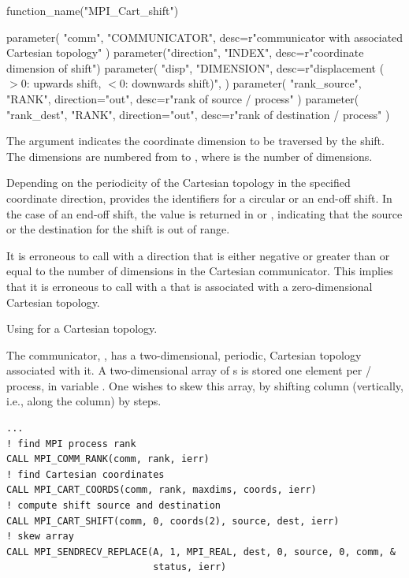 \begin{mpi-binding}
    function_name("MPI_Cart_shift")
    
    parameter(
        "comm", "COMMUNICATOR", desc=r"communicator with associated Cartesian topology"
    )
    parameter("direction", "INDEX", desc=r"coordinate dimension of shift")
    parameter(
        "disp",
        "DIMENSION",
        desc=r"displacement ($> 0$: upwards shift, $< 0$: downwards shift)",
    )
    parameter(
        "rank_source", "RANK", direction="out", desc=r"rank of source \MPI/ process"
    )
    parameter(
        "rank_dest", "RANK", direction="out", desc=r"rank of destination \MPI/ process"
    )
\end{mpi-binding}

The  argument indicates the coordinate dimension to be traversed by the shift.
The dimensions are numbered from  to , where  is the number of dimensions.

Depending on the periodicity of the Cartesian topology in the specified
coordinate direction,  provides the identifiers for a
circular or an end-off shift. In the case of an end-off shift,
the value  is returned in  or
,
indicating that the source or the destination for the shift is out of range.
 
It is erroneous to call  with a direction that is either
negative or greater than or equal to the number of dimensions in the Cartesian
communicator. This implies that it is erroneous to call  with a
 that is associated with a zero-dimensional Cartesian topology.

\begin{example}
\label{topol-exD}
%
Using  for a Cartesian topology.

The communicator, , has a two-dimensional, periodic, Cartesian
topology associated with it.  A two-dimensional array of s is stored
one element per \MPI/ process, in variable .  One wishes to skew this array,
by shifting column  (vertically, i.e., along the column) by
 steps.
\begin{lstlisting}[language={[MPI]Fortran}]
...
! find MPI process rank
CALL MPI_COMM_RANK(comm, rank, ierr)
! find Cartesian coordinates
CALL MPI_CART_COORDS(comm, rank, maxdims, coords, ierr)
! compute shift source and destination
CALL MPI_CART_SHIFT(comm, 0, coords(2), source, dest, ierr)
! skew array
CALL MPI_SENDRECV_REPLACE(A, 1, MPI_REAL, dest, 0, source, 0, comm, &
                          status, ierr)
\end{lstlisting}
\end{example}

